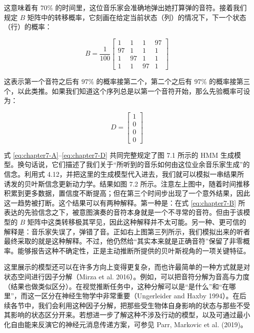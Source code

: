 这意味着有 $70\%$ 的时间里，这位音乐家会准确地弹出她打算弹的音符。接着我们规定 $B$ 矩阵中的转移概率，它刻画在给定当前状态（列）的情况下，下一个状态（行）的概率：

\begin{equation}
B=\frac{1}{100}
\begin{bmatrix}
1 & 1 & 1 & 97 \\
97 & 1 & 1 & 1 \\
1 & 97 & 1 & 1 \\
1 & 1 & 97 & 1
\end{bmatrix}
\label{eq:chapter7-B}
\end{equation}

这表示第一个音符之后有 $97\%$ 的概率接第二个，第二个之后有 $97\%$ 的概率接第三个，以此类推。如果我们知道这个序列总是以第一个音符开始，那么先验概率可设为：

\begin{equation}
D=
\begin{bmatrix}
1 \\
0 \\
0 \\
0
\end{bmatrix}
\label{eq:chapter7-D}
\end{equation}

式 \eqref{eq:chapter7-A}--\eqref{eq:chapter7-D} 共同完整规定了图 7.1 所示的 HMM 生成模型。换句话说，它们描述了我们关于“所听到的音乐如何由这位业余音乐家生成”的信念。利用式 4.12，并把这里的生成模型代入进去，我们就可以模拟一串结果所诱发的贝叶斯信念更新动力学。结果如图 7.2 所示。注意左上图中，随着时间推移积累到更多数据，置信度不断提高；但在第三个时间步出现了一个意外结果，因此这一趋势被打断。这个结果可以有两种解释。第一种是：在式 \eqref{eq:chapter7-B} 所表达的先验信念之下，被意图演奏的音符本身就是一个不寻常的音符。但由于该模型的 $B$ 矩阵中这类转移极其罕见，因此这种解释并不太可能。另一种、更可信的解释是：音乐家失误了，弹错了音。正如右上图第三列所示，我们模拟出来的听者最终采取的就是这种解释。不过，他仍然给“其实本来就是正确音符”保留了非零概率。能够报告这种不确定性，正是主动推断所提供的贝叶斯视角的一项关键特征。

这里展示的模型还可以在许多方向上变得更复杂，而也许最简单的一种方式就是对状态空间进行因子分解（Mirza et al. 2016）。例如，可以把音符分解为音高与力度（结果也做类似区分）。在视觉推断任务中，这种分解可以是“是什么”和“在哪里”，而这一区分在神经生物学中非常重要（Ungerleider and Haxby 1994）。在后续各节中，我们会利用这种因子分解，把那些受生物体自身影响的状态与那些不受其影响的状态区分开来。若想进一步了解这种不涉及行动的模型，以及可通过最小化自由能来反演它的神经元消息传递方案，可参见 Parr, Markovic et al. (2019)。

